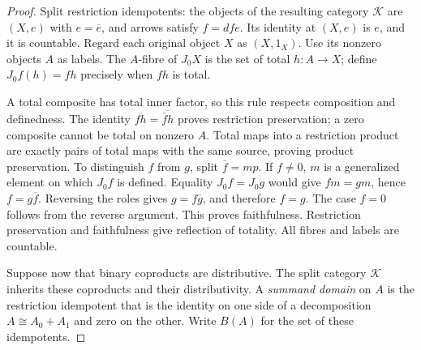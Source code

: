 \documentclass[11pt]{article}
\theoremstyle{definition}
\begin{document}
\begin{proof}
Split restriction idempotents: the objects of the resulting category
$\mathcal K$ are $(X,e)$ with $e=\overline e$, and arrows satisfy
$f=dfe$. Its identity at $(X,e)$ is $e$, and it is countable.
Regard each original object $X$ as $(X,1_X)$.
Use its nonzero objects $A$ as labels. The $A$-fibre of $J_0X$ is
the set of total $h:A\to X$; define $J_0f(h)=fh$ precisely when
$fh$ is total.

A total composite has total inner factor, so this rule respects
composition and definedness. The identity
$\overline{fh}=\overline{\overline f h}$ proves restriction
preservation; a zero composite cannot be total on nonzero $A$.
Total maps into a restriction product are exactly pairs of total maps
with the same source, proving product preservation.
To distinguish $f$ from $g$, split $\overline f=mp$.
If $f\ne0$, $m$ is a generalized element on which $J_0f$ is
defined. Equality $J_0f=J_0g$ would give $fm=gm$, hence
$f=g\overline f$. Reversing the roles gives $g=f\overline g$,
and therefore $f=g$. The case $f=0$ follows from the reverse
argument. This proves faithfulness. Restriction preservation and
faithfulness give reflection of totality. All fibres and labels
are countable.

Suppose now that binary coproducts are distributive. The split category
$\mathcal K$ inherits these coproducts and their distributivity. A
\emph{summand domain} on $A$ is the restriction idempotent that is the
identity on one side of a decomposition $A\cong A_0+A_1$ and zero on
the other. Write $B(A)$ for the set of these idempotents.


\end{proof}
\end{document}

